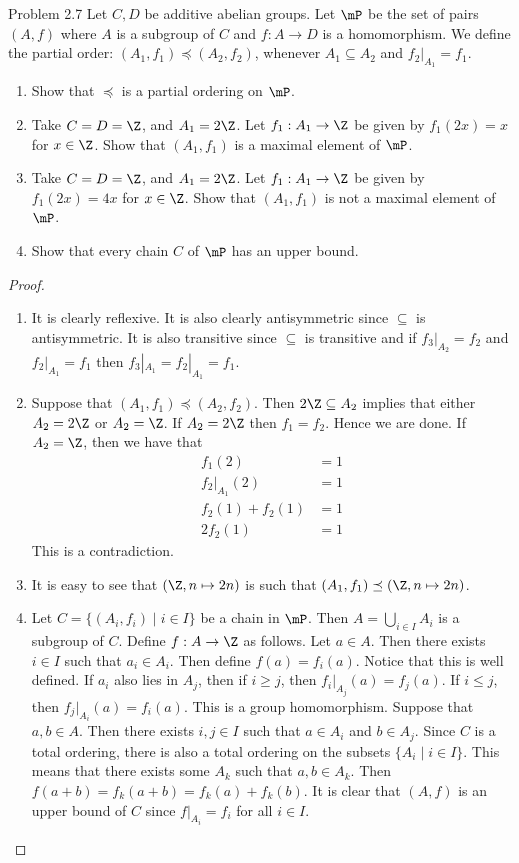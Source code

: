 \documentclass[a4paper]{article}
\begin{document}
\begin{ex}{Problem 2.7}{} Let $C,D$ be additive abelian groups. Let $\mP$ be the set of pairs $(A,f)$ where $A$ is a subgroup of $C$ and $f:A\to D$ is a homomorphism. We define the partial order: $(A_1,f_1)\preceq(A_2,f_2)$, whenever $A_1\subseteq A_2$ and $f_2|_{A_1}=f_1$. 
\begin{enumerate}
\item Show that $\preceq$ is a partial ordering on $\mP$.
\item Take $C=D=\Z$, and $A_1=2\Z$. Let $f_1:A_1\to\Z$ be given by $f_1(2x)=x$ for $x\in\Z$. Show that $(A_1,f_1)$ is a maximal element of $\mP$.
\item Take $C=D=\Z$, and $A_1=2\Z$. Let $f_1:A_1\to\Z$ be given by $f_1(2x)=4x$ for $x\in\Z$. Show that $(A_1,f_1)$ is not a maximal element of $\mP$.
\item Show that every chain $C$ of $\mP$ has an upper bound.
\end{enumerate} 
\begin{proof}~\\
\begin{enumerate}
\item It is clearly reflexive. It is also clearly antisymmetric since $\subseteq$ is antisymmetric. It is also transitive since $\subseteq$ is transitive and if $f_3|_{A_2}=f_2$ and $f_2|_{A_1}=f_1$ then $f_3|_{A_1}=f_2|_{A_1}=f_1$. 
\item Suppose that $(A_1,f_1)\preceq(A_2,f_2)$. Then $2\Z\subseteq A_2$ implies that either $A_2=2\Z$ or $A_2=\Z$. If $A_2=2\Z$ then $f_1=f_2$. Hence we are done. If $A_2=\Z$, then we have that 
\begin{align*}
f_1(2)&=1\\
f_2|_{A_1}(2)&=1\\
f_2(1)+f_2(1)&=1\\
2f_2(1)&=1
\end{align*}
This is a contradiction. 
\item It is easy to see that $(\Z,n\mapsto 2n)$ is such that $(A_1,f_1)\preceq(\Z,n\mapsto 2n)$. 
\item Let $C=\{(A_i,f_i)\;|\;i\in I\}$ be a chain in $\mP$. Then $A=\bigcup_{i\in I}A_i$ is a subgroup of $C$. Define $f:A\to\Z$ as follows. Let $a\in A$. Then there exists $i\in I$ such that $a_i\in A_i$. Then define $f(a)=f_i(a)$. Notice that this is well defined. If $a_i$ also lies in $A_j$, then if $i\geq j$, then $f_i|_{A_j}(a)=f_j(a)$. If $i\leq j$, then $f_j|_{A_i}(a)=f_i(a)$. This is a group homomorphism. Suppose that $a,b\in A$. Then there exists $i,j\in I$ such that $a\in A_i$ and $b\in A_j$. Since $C$ is a total ordering, there is also a total ordering on the subsets $\{A_i\;|\;i\in I\}$. This means that there exists some $A_k$ such that $a,b\in A_k$. Then $f(a+b)=f_k(a+b)=f_k(a)+f_k(b)$. It is clear that $(A,f)$ is an upper bound of $C$ since $f|_{A_i}=f_i$ for all $i\in I$. 
\end{enumerate}
\end{proof}
\end{ex}
\end{document}
